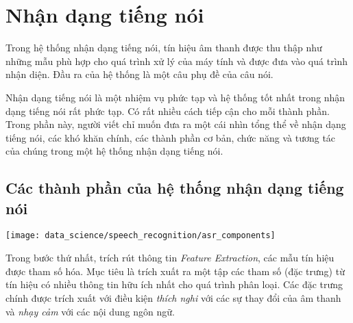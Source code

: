 \chapter{Nhận dạng tiếng nói}





Trong hệ thống nhận dạng tiếng nói, tín hiệu âm thanh được thu thập như những mẫu phù hợp cho quá trình xử lý của máy tính và được đưa vào quá trình nhận diện. Đầu ra của hệ thống là một câu phụ đề của câu nói.

Nhận dạng tiếng nói là một nhiệm vụ phức tạp và hệ thống tốt nhất trong nhận dạng tiếng nói rất phức tạp. Có rất nhiều cách tiếp cận cho mỗi thành phần. Trong phần này, người viết chỉ muốn đưa ra một cái nhìn tổng thể về nhận dạng tiếng nói, các khó khăn chính, các thành phần cơ bản, chức năng và tương tác của chúng trong một hệ thống nhận dạng tiếng nói.

\section{Các thành phần của hệ thống nhận dạng tiếng nói}

\texttt{[image: data\_science/speech\_recognition/asr\_components]}

Trong bước thứ nhất, trích rút thông tin \textit{Feature Extraction}, các mẫu tín hiệu được tham số hóa. Mục tiêu là trích xuất ra một tập các tham số (đặc trưng) từ tín hiệu có nhiều thông tin hữu ích nhất cho quá trình phân loại.  Các đặc trưng chính được trích xuất với điều kiện \textit{thích nghi} với các sự thay đổi của âm thanh và \textit{nhạy cảm} với các nội dung ngôn ngữ.

